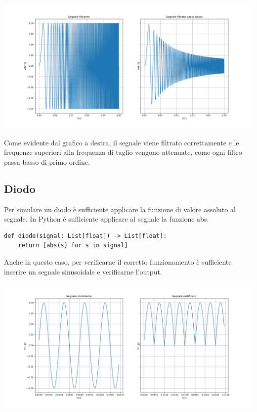\documentclass{article}
\begin{document}
\begin{center}
    \includegraphics[width=\textwidth]{filtrato-test.png}
\end{center}

Come evidente dal grafico a destra, il segnale viene filtrato correttamente e le frequenze superiori
alla frequenza di taglio vengono attenuate, come ogni filtro passa basso di primo ordine.

\subsection{Diodo}
Per simulare un diodo è sufficiente applicare la funzione di valore assoluto al segnale. In Python
è sufficiente applicare al segnale la funzione abs.

\begin{verbatim}
def diode(signal: List[float]) -> List[float]:
    return [abs(s) for s in signal]
\end{verbatim}

Anche in questo caso, per verificarne il corretto funzionamento è sufficiente inserire un segnale
sinusoidale e verificarne l'output.

\begin{center}
    \includegraphics[width=\textwidth]{diode.png}
\end{center}
\end{document}
